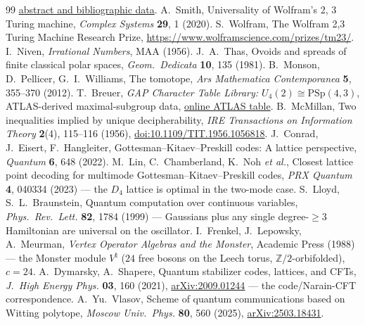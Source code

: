 \documentclass[11pt]{article}
\newcommand{\PSp}{\mathrm{PSp}}
\begin{document}
\begin{thebibliography}{99}
  \href{https://homes.cs.washington.edu/~mernst/pubs/graycodes-dm2002-abstract.html}{abstract and bibliographic data}.
 A.~Smith,
  Universality of Wolfram's 2, 3 Turing machine,
  \emph{Complex Systems} \textbf{29}, 1 (2020).
 S.~Wolfram,
  The Wolfram 2,3 Turing Machine Research Prize,
  \url{https://www.wolframscience.com/prizes/tm23/}.
 I.~Niven, \emph{Irrational Numbers}, MAA (1956).
 J.~A.~Thas, Ovoids and spreads of finite classical
  polar spaces, \emph{Geom.~Dedicata} \textbf{10}, 135 (1981).
 B.~Monson, D.~Pellicer, G.~I.~Williams,
  The tomotope, \emph{Ars Mathematica Contemporanea} \textbf{5},
  355--370 (2012).
 T.~Breuer, \emph{GAP Character Table Library:
  $U_4(2)\cong\PSp(4,3)$}, ATLAS-derived maximal-subgroup data,
  \href{https://www.math.rwth-aachen.de/homes/sam/ctbllib/ctbltoc/data/U4%282%29.html}{online ATLAS table}.
 B.~McMillan, Two inequalities implied by unique
  decipherability, \emph{IRE Transactions on Information Theory}
  \textbf{2}(4), 115--116 (1956),
  \href{https://doi.org/10.1109/TIT.1956.1056818}{doi:10.1109/TIT.1956.1056818}.
 J.~Conrad, J.~Eisert, F.~Hangleiter,
  Gottesman--Kitaev--Preskill codes: A lattice perspective,
  \emph{Quantum} \textbf{6}, 648 (2022).
 M.~Lin, C.~Chamberland, K.~Noh \emph{et al.},
  Closest lattice point decoding for multimode Gottesman--Kitaev--Preskill
  codes, \emph{PRX Quantum} \textbf{4}, 040334 (2023) --- the $D_4$ lattice is
  optimal in the two-mode case.
 S.~Lloyd, S.~L.~Braunstein,
  Quantum computation over continuous variables,
  \emph{Phys.\ Rev.\ Lett.} \textbf{82}, 1784 (1999) --- Gaussians plus any
  single degree-$\ge 3$ Hamiltonian are universal on the oscillator.
 I.~Frenkel, J.~Lepowsky, A.~Meurman,
  \emph{Vertex Operator Algebras and the Monster}, Academic Press (1988) ---
  the Monster module $V^{\natural}$ ($24$ free bosons on the Leech torus,
  $\mathbb Z/2$-orbifolded), $c=24$.
 A.~Dymarsky, A.~Shapere,
  Quantum stabilizer codes, lattices, and CFTs,
  \emph{J.\ High Energy Phys.} \textbf{03}, 160 (2021),
  \href{https://arxiv.org/abs/2009.01244}{arXiv:2009.01244} --- the
  code/Narain-CFT correspondence.
 A.~Yu.~Vlasov,
  Scheme of quantum communications based on Witting polytope,
  \emph{Moscow Univ.\ Phys.} \textbf{80}, 560 (2025),
  \href{https://arxiv.org/abs/2503.18431}{arXiv:2503.18431}.

\end{thebibliography}
\end{document}
